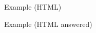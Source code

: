 \begin{frame}[t]{Example (HTML)}
  
  \begin{center}
  
  \end{center}
  
\end{frame}
\begin{frame}[t]{Example (HTML answered)}
  
  \begin{center}
  
  \end{center}
  
\end{frame}

